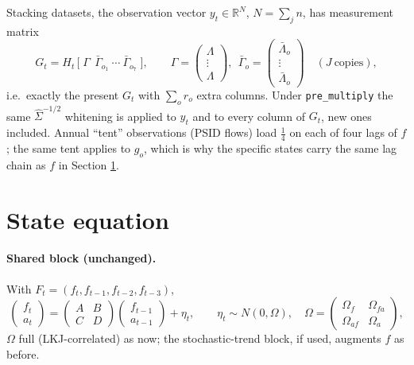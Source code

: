 \documentclass[11pt]{article}
\newcommand{\code}[1]{\texttt{#1}}
\newcommand{\R}{\mathbb{R}}
\begin{document}
Stacking datasets, the observation vector $y_t \in \R^{N}$, $N = \sum_j n$,
has measurement matrix
\begin{equation}
  G_t = H_t\,\bigl[\; \Gamma\ \ \bar\Gamma_{o_1}\ \cdots\ \bar\Gamma_{o_7} \;\bigr],
  \qquad
  \Gamma = \begin{pmatrix}\Lambda\\ \vdots\\ \Lambda\end{pmatrix},\ \
  \bar\Gamma_o = \begin{pmatrix}\bar\Lambda_o\\ \vdots\\ \bar\Lambda_o\end{pmatrix}
  \quad(J\ \text{copies}),
\end{equation}
i.e.\ exactly the present $G_t$ with $\sum_o r_o$ extra columns. Under
\code{pre\_multiply} the same $\hat\Sigma^{-1/2}$ whitening is applied to
$y_t$ and to every column of $G_t$, new ones included. Annual ``tent''
observations (PSID flows) load $\tfrac14$ on each of four lags of $f$; the same
tent applies to $g_o$, which is why the specific states carry the same lag
chain as $f$ in Section \ref{sec:state}.

\section{State equation}\label{sec:state}

\paragraph{Shared block (unchanged).} With $F_t = (f_t, f_{t-1}, f_{t-2}, f_{t-3})$,
\begin{equation}
  \begin{pmatrix} f_t \\ a_t \end{pmatrix}
  = \begin{pmatrix} A & B \\ C & D \end{pmatrix}
    \begin{pmatrix} f_{t-1} \\ a_{t-1} \end{pmatrix} + \eta_t,
  \qquad \eta_t \sim N(0,\Omega),\quad
  \Omega = \begin{pmatrix}\Omega_f & \Omega_{fa}\\ \Omega_{af} & \Omega_a\end{pmatrix},
\end{equation}
$\Omega$ full (LKJ-correlated) as now; the stochastic-trend block, if used,
augments $f$ as before.
\end{document}
